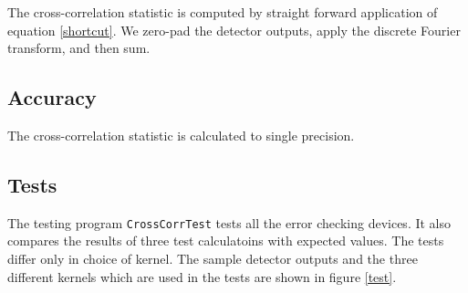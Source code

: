 \documentclass{article}
\begin{document}
The cross-correlation statistic is computed by straight forward application of equation \ref{shortcut}.  
We zero-pad the detector outputs, apply the discrete Fourier transform, and then sum. 

\subsection{Accuracy}

The cross-correlation statistic is calculated to single precision.

\subsection{Tests}

The testing program {\tt CrossCorrTest} tests all the error checking devices.
It also compares the results of three test calculatoins 
with expected values.  The tests differ only in choice of kernel. 
The sample detector outputs and the three different kernels which are used in the tests 
are shown in figure \ref{test}.
\end{document}
